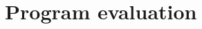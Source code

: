 \documentclass[11pt,oneside,a4paper]{report}
\begin{document}
\chapter{Program evaluation}

%
\end{document}
